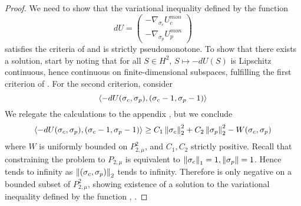 \begin{proof}
  We need to show that the variational inequality defined by the function
  \begin{equation}
    \label{eq:var_ineq}
    dU = \begin{pmatrix}-\nabla_{\sigma_c} U_c^{mon} \\ -\nabla_{\sigma_p} U_p^{mon}\end{pmatrix}
  \end{equation} satisfies the criteria of  and is strictly pseudomonotone.
  To show that there exists a solution, start by noting that for all $S\in H^2$, $S\mapsto -dU(S)$ is Lipschitz continuous, hence continuous on finite-dimensional subspaces, fulfilling the first criterion of . For the second criterion, consider
  \begin{equation}
    \label{eq:du}
    \left \langle -dU(\sigma_c,\sigma_p),(\sigma_c-1, \sigma_p-1) \right \rangle
  \end{equation}
  We relegate the calculations to the appendix , but we conclude
  \begin{equation}
    \label{eq:fin_exist}
    \left \langle -dU(\sigma_c,\sigma_p),(\sigma_c-1, \sigma_p-1) \right \rangle \geq C_1\left \Vert \sigma_c \right \Vert_2^2 + C_2\left \Vert \sigma_p \right \Vert_2^2 - W(\sigma_c,\sigma_p)
  \end{equation}
  where $W$ is uniformly bounded on $P_{2,\mu}^2$, and $C_1,C_2$ strictly positive. Recall that constraining the problem to $P_{2,\mu}$ is equivalent to $\left \Vert \sigma_c \right \Vert_1 = 1, \left \Vert \sigma_p \right \Vert = 1$. Hence  tends to infinity as $\left \Vert (\sigma_c,\sigma_p) \right \Vert_2$ tends to infinity. Therefore  is only negative on a bounded subset of $P^2_{2,\mu}$, showing existence of a solution to the variational inequality defined by the function , .


\end{proof}
